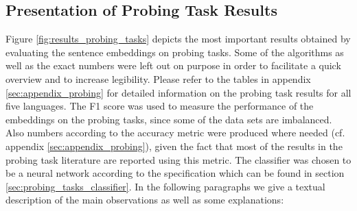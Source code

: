 \subsection{Presentation of Probing Task Results}
\label{sec:results_probing_tasks}

Figure \vref{fig:results_probing_tasks} depicts the most important results obtained by evaluating the sentence embeddings on probing tasks. Some of the algorithms as well as the exact numbers were left out on purpose in order to facilitate a quick overview and to increase legibility. Please refer to the tables in appendix \vref{sec:appendix_probing} for detailed information on the probing task results for all five languages. The F1 score was used to measure the performance of the embeddings on the probing tasks, since some of the data sets are imbalanced. Also numbers according to the accuracy metric were produced where needed (cf. appendix \vref{sec:appendix_probing}), given the fact that most of the results in the probing task literature are reported using this metric. The classifier was chosen to be a neural network according to the specification which can be found in section \vref{sec:probing_tasks_classifier}. In the following paragraphs we give a textual description of the main observations as well as some explanations:


